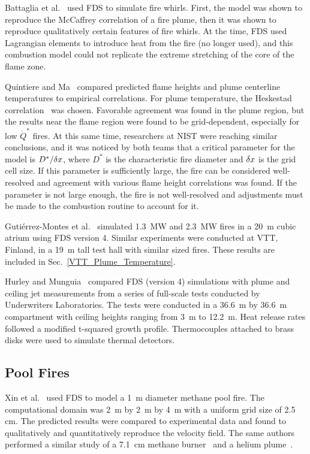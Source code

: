 Battaglia et al.~\cite{Battaglia:1} used FDS to simulate fire whirls.  First, the model was shown to reproduce the McCaffrey correlation of a fire plume,  then it was shown to reproduce qualitatively certain features of fire whirls. At the time, FDS used Lagrangian elements to introduce heat from the fire (no longer used), and this combustion model could not replicate the extreme stretching of the core of the flame zone.

Quintiere and Ma~\cite{Ma:2,Ma:3} compared predicted flame heights and plume centerline temperatures to empirical correlations.  For plume temperature,  the Heskestad  correlation~\cite{SFPE:Heskestad} was chosen. Favorable agreement was found in the plume region, but the results near the flame region were found to be grid-dependent, especially for low $\dot{Q}^*$ fires. At this same time, researchers at NIST were reaching similar conclusions, and it was noticed by both teams that a critical parameter for the model is $D^*/\delta x$, where $D^*$ is the characteristic fire diameter and $\delta x$ is the grid cell size. If this parameter is sufficiently large, the fire can be considered well-resolved and agreement with various flame height correlations was found. If the parameter is not large enough, the fire is not well-resolved and adjustments must be made to the combustion routine to account for it.

Guti\'{e}rrez-Montes et al.~\cite{Gutierrez:Building_and_Environment} simulated 1.3~MW and 2.3~MW fires in a 20~m cubic atrium using FDS version 4. Similar experiments were conducted at VTT, Finland, in a 19~m tall test hall with similar sized fires. These results are included in Sec.~\ref{VTT_Plume_Temperature}.

Hurley and Munguia~\cite{Hurley:GCR09-921,Hurley:JFPE2009} compared FDS (version 4) simulations with plume and ceiling jet measurements from a series of full-scale tests conducted by Underwriters Laboratories. The tests were conducted in a 36.6~m by 36.6~m compartment with ceiling heights ranging from 3~m to 12.2~m. Heat release rates followed a modified t-squared growth profile. Thermocouples attached to brass disks were used to simulate thermal detectors.


\subsection{Pool Fires}

Xin et al.~\cite{Xin:JSS2005} used FDS to model a 1~m diameter methane pool fire. The computational domain was 2~m by 2~m by 4~m with a uniform grid size of 2.5 cm. The predicted results were compared to  experimental data and found  to qualitatively and quantitatively reproduce  the velocity field.  The same authors performed a similar study of a 7.1~cm methane burner~\cite{Xin:CF2005} and a helium plume~\cite{Xin:CS2002}.


